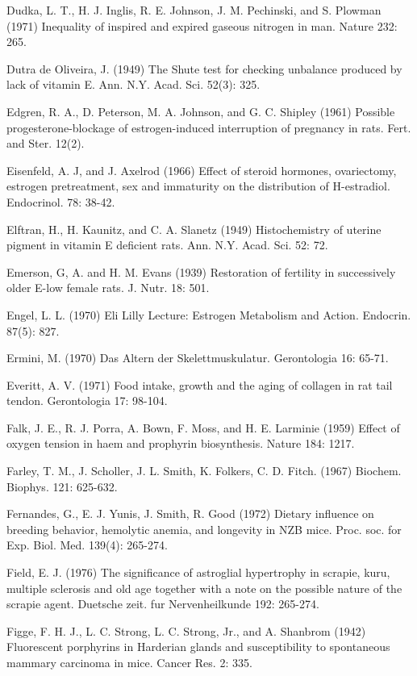 Dudka, L. T., H. J. Inglis, R. E. Johnson, J. M. Pechinski, and S. Plowman (1971) Inequality of inspired and expired gaseous nitrogen in man. Nature 232: 265.

Dutra de Oliveira, J. (1949) The Shute test for checking unbalance produced by lack of vitamin E. Ann. N.Y. Acad. Sci. 52(3): 325.

Edgren, R. A., D. Peterson, M. A. Johnson, and G. C. Shipley (1961) Possible progesterone-blockage of estrogen-induced interruption of pregnancy in rats. Fert. and Ster. 12(2).

Eisenfeld, A. J, and J. Axelrod (1966) Effect of steroid hormones, ovariectomy, estrogen pretreatment, sex and immaturity on the distribution of H-estradiol. Endocrinol. 78: 38-42.

Elftran, H., H. Kaunitz, and C. A. Slanetz (1949) Histochemistry of uterine pigment in vitamin E deficient rats. Ann. N.Y. Acad. Sci. 52: 72.

Emerson, G, A. and H. M. Evans (1939) Restoration of fertility in successively older E-low female rats. J. Nutr. 18: 501.


Engel, L. L. (1970) Eli Lilly Lecture: Estrogen Metabolism and Action. Endocrin. 87(5): 827.

Ermini, M. (1970) Das Altern der Skelettmuskulatur. Gerontologia 16: 65-71.

Everitt, A. V. (1971) Food intake, growth and the aging of collagen in rat tail tendon. Gerontologia 17: 98-104.

Falk, J. E., R. J. Porra, A. Bown, F. Moss, and H. E. Larminie (1959) Effect of oxygen tension in haem and prophyrin biosynthesis. Nature 184: 1217.

Farley, T. M., J. Scholler, J. L. Smith, K. Folkers, C. D. Fitch. (1967) Biochem. Biophys. 121: 625-632.

Fernandes, G., E. J. Yunis, J. Smith, R. Good (1972) Dietary influence on breeding behavior, hemolytic anemia, and longevity in NZB mice. Proc. soc. for Exp. Biol. Med. 139(4): 265-274.

Field, E. J. (1976) The significance of astroglial hypertrophy in scrapie, kuru, multiple sclerosis and old age together with a note on the possible nature of the scrapie agent. Duetsche zeit. fur Nervenheilkunde 192: 265-274.

Figge, F. H. J., L. C. Strong, L. C. Strong, Jr., and A. Shanbrom (1942) Fluorescent porphyrins in Harderian glands and susceptibility to spontaneous mammary carcinoma in mice. Cancer Res. 2: 335.


